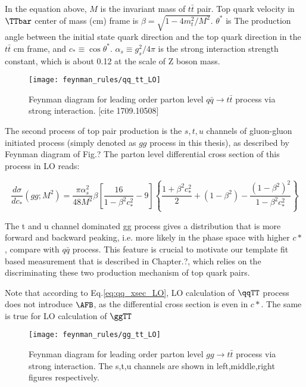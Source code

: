 In the equation above, $M$ is the invariant mass of $t\bar t$ pair. Top quark velocity in $\TTbar$ center of mass (cm) frame is $\beta=\sqrt{1-4m_t^2/M^2}$.  $\theta^*$ is The production angle between the initial state quark direction and the top quark direction in the $t\bar t$ cm frame, and $c_*\equiv\cos{\theta^*}$. $\alpha_s\equiv g_s^2/4\pi$ is the strong interaction strength constant, which is about 0.12 at the scale of Z boson mass.

\begin{figure}[hbt]
  \begin{center}
    \texttt{[image: feynman\_rules/qq\_tt\_LO]}
  \caption{\small Feynman diagram for leading order parton level $q\bar q \rightarrow t\bar t$ process via strong interaction. [cite 1709.10508]}
    \label{fig:qq_tt_LO}
  \end{center}
\end{figure}

The second process of top pair production is the $s,t,u$ channels of gluon-gluon initiated process (simply denoted as $gg$ process in this thesis), as described by Feynman diagram of Fig.? The parton level differential cross section of this process in LO reads:

\begin{equation}
\frac{d\sigma}{dc_*}(gg;M^2) = \frac{\pi\alpha_s^2}{48M^2}\beta\left[\frac{16}{1-\beta^2c_*^2}-9\right]\left\lbrace\frac{1+\beta^2c_*^2}{2}+(1-\beta^2)-\frac{(1-\beta^2)^2}{1-\beta^2c_*^2}\right\rbrace
\label{eq:gg_xsec_LO}
\end{equation}

The t and u channel dominated gg process gives a distribution that is more forward and backward peaking, i.e. more likely in the phase space with higher $c*$, compare with $q\bar q $ process. This feature is crucial to motivate our template fit based measurement that is described in Chapter.?, which relies on the discriminating these two production mechanism of top quark pairs.

Note that according to Eq.\ref{eq:qq_xsec_LO}, LO calculation of $\qqTT$ process does not introduce $\AFB$, as the differential cross section is even in $c*$. The same is true for LO calculation of $\ggTT$

\begin{figure}[hbt]
  \begin{center}
    \texttt{[image: feynman\_rules/gg\_tt\_LO]}
  \caption{\small Feynman diagram for leading order parton level $gg \rightarrow t\bar t$ process via strong interaction. The s,t,u channels are shown in left,middle,right figures respectively.  }
    \label{fig:gg_tt_LO}
  \end{center}
\end{figure}

